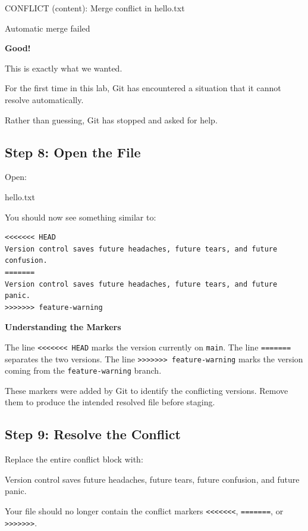 \documentclass{csc2059practical}
\begin{document}
\begin{terminalplain}
CONFLICT (content): Merge conflict in hello.txt
\end{terminalplain}
\begin{terminalplain}
Automatic merge failed
\end{terminalplain}
\begin{importantnote}
\textbf{Good!}\par
\medskip
This is exactly what we wanted.

For the first time in this lab, Git has encountered a situation that it cannot resolve automatically.

Rather than guessing, Git has stopped and asked for help.
\end{importantnote}
\subsection{Step 8: Open the File}
Open:

\begin{terminalplain}
hello.txt
\end{terminalplain}
You should now see something similar to:

\begin{verbatim}
<<<<<<< HEAD
Version control saves future headaches, future tears, and future confusion.
=======
Version control saves future headaches, future tears, and future panic.
>>>>>>> feature-warning
\end{verbatim}

\begin{importantnote}
\textbf{Understanding the Markers}\par
\medskip
The line \texttt{<<<<<<< HEAD} marks the version currently on \texttt{main}. The line \texttt{=======} separates the two versions. The line \texttt{>>>>>>> feature-warning} marks the version coming from the \texttt{feature-warning} branch.

These markers were added by Git to identify the conflicting versions. Remove them to produce the intended resolved file before staging.
\end{importantnote}

\subsection{Step 9: Resolve the Conflict}
Replace the entire conflict block with:

\begin{terminal}
Version control saves future headaches, future tears, future confusion, and future panic.
\end{terminal}
Your file should no longer contain the conflict markers \texttt{<<<<<<<}, \texttt{=======}, or \texttt{>>>>>>>}.
\end{document}
